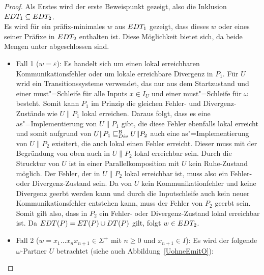 \begin{proof}
  Als Erstes wird der erste Beweispunkt gezeigt, also die Inklusion $EDT
  _1\subseteq EDT _2$.\\
  Es wird für ein präfix-minimales $w$ aus $EDT _1$ gezeigt, dass dieses $w$
  oder eines seiner Präfixe in $EDT _2$ enthalten ist. Diese Möglichkeit
  bietet sich, da beide Mengen unter \cont{} abgeschlossen sind.
  \begin{itemize}
    \item Fall 1 ($w=\varepsilon$): Es handelt sich um einen lokal erreichbaren
      Kommunikationsfehler oder um lokale erreichbare Divergenz in $P_1$. Für
      $U$ wrid ein Transitionssysteme verwendet, das nur aus dem Startzustand
      und einer must"=Schleife für alle Inputs $x\in I_U$ und einer
      must"=Schleife für $\omega$ besteht. Somit kann $P_1$ im Prinzip die
      gleichen Fehler- und Divergenz-Zustände wie $U\|P_1$ lokal erreichen.
      Daraus folgt, dass es eine as"=Implementierung von $U\|P_1$ gibt, die
      diese Fehler ebenfalls lokal erreicht und somit aufgrund von $U\|P_1
       \sqsubseteq  _{Div}^\mathrm{B} U\|P_2$ auch eine as"=Implementierung von $U\|P_2$ exisitert, die
      auch lokal einen Fehler erreicht. Dieser muss mit der Begründung von oben
      auch in $U\|P_2$ lokal erreichbar sein. Durch die Strucktur von $U$ ist
      in einer Parallelkomposition mit $U$ kein Ruhe-Zustand möglich. Der
      Fehler, der in $U\|P_2$ lokal erreichbar ist, muss also ein Fehler- oder
      Divergenz-Zustand sein. Da von $U$ kein Kommunikationfehler und keine
      Divergenz geerbt werden kann und durch die Inputschleife auch kein neuer
      Kommunikationsfehler entstehen kann, muss der Fehler von $P_2$ geerbt
      sein. Somit gilt also, dass in $P_2$ ein Fehler- oder Divergenz-Zustand
      lokal erreichbar ist. Da $EDT (P) =ET (P)\cup DT (P)$ gilt, folgt $w\in
      EDT _2$.
    \item Fall 2 ($w=x_1\dots x_n x_{n+1}\in\Sigma ^+$ mit $n\geq 0$ und
      $x_{n+1}\in I$): Es wird der folgende $\omega$-Partner $U$ betrachtet
      (siehe auch Abbildung~\ref{UohneEmitO}):
\end{itemize}
\end{proof}
